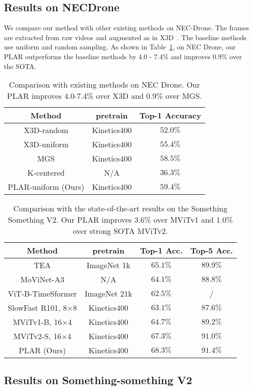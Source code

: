 \documentclass[letterpaper, 10 pt, conference]{ieeeconf}
\begin{document}
\subsection{Results on NECDrone}
We compare our method with other existing methods on NEC-Drone. The frames are extracted from raw videos and augmented as in X3D~\cite{feichtenhofer2020x3d}. The baseline methods use uniform and random sampling. As shown in Table~\ref{tab:nec}, on NEC Drone, our PLAR outperforms the baseline methods by 4.0 - 7.4\% and improves 0.9\% over the SOTA.
\begin{table}[h]
\centering
\begin{tabular}{c c c}
\toprule
Method & pretrain  & Top-1 Accuracy   \\
\midrule
X3D-random \cite{feichtenhofer2020x3d} &  Kinetics400 & $52.0\%$  \\
X3D-uniform \cite{feichtenhofer2020x3d} &  Kinetics400 & $55.4\%$  \\
MGS \cite{zhi2021mgsampler} &  Kinetics400 & $58.5\%$  \\ 
K-centered \cite{park2022k} &  N/A & $36.3\%$  \\ 
PLAR-uniform (Ours) & Kinetics400 & $59.4\%$  \\
\bottomrule
\end{tabular}
\caption{Comparison with existing methods on NEC Drone. Our PLAR improves 4.0-7.4\% over X3D and 0.9\% over MGS.}
\label{tab:nec}
\end{table} 
\begin{table}[t]
\centering
\begin{tabular}{c c c c}
\toprule
Method & pretrain  & Top-1 Acc. & Top-5 Acc.    \\
\midrule
TEA \cite{li2020tea} &  ImageNet 1k & $65.1\%$ & $89.9\%$ \\
MoViNet-A3 \cite{kondratyuk2021movinets} &  N/A & $64.1\%$ &  $88.8\%$ \\
ViT-B-TimeSformer \cite{bertasius2021space} &  ImageNet 21k & $62.5\%$ & / \\ 
SlowFast R101, 8$\times$8 \cite{feichtenhofer2019slowfast} &  Kinetics400 & $63.1\%$ & $87.6\%$ \\ 
MViTv1-B, 16$\times$4 \cite{fan2021multiscale} &  Kinetics400 & $64.7\%$ & $89.2\%$ \\ 
MViTv2-S, 16$\times$4 \cite{li2022mvitv2} &  Kinetics400 & $67.3\%$ & $91.0\%$ \\ 
PLAR (Ours) & Kinetics400 & $68.3\%$ & $91.4\%$ \\
\bottomrule
\end{tabular}
\caption{Comparison with the state-of-the-art results on the Something Something V2. Our PLAR improves 3.6\% over MViTv1 and 1.0\% over strong SOTA MViTv2.}
\label{tab:ssv2}
\vspace{-3mm}
\end{table} \subsection{Results on Something-something V2}
\end{document}
